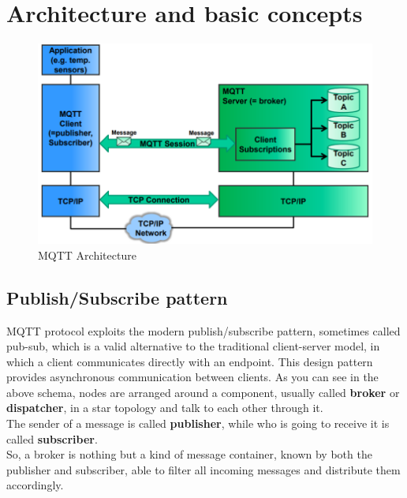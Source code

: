 \documentclass[12pt]{report}
\begin{document}

\section{Architecture and basic concepts}
\begin{figure}[H]
\includegraphics{mqtt_architecture}
\caption{MQTT Architecture}
\end{figure}

\bigskip
\subsection{Publish/Subscribe pattern}
\bigskip
MQTT protocol exploits the modern publish/subscribe pattern, sometimes called pub-sub, which is a valid alternative to the traditional client-server model, in which a client communicates directly with an endpoint.
This design pattern provides asynchronous communication between clients.
As you can see in the above schema, nodes are arranged around a component, usually called \textbf{broker} or \textbf{dispatcher}, in a star topology and talk to each other through it.\\
The sender of a message is called \textbf{publisher}, while who is going to receive it is called \textbf{subscriber}.\\
So, a broker is nothing but a kind of message container, known by both the publisher and subscriber, able to filter all incoming messages and distribute them accordingly.\\
\end{document}
